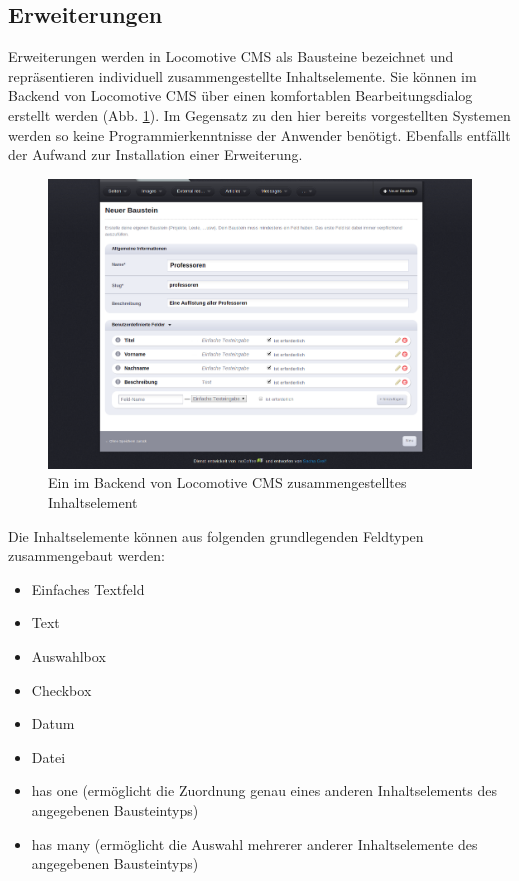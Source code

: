 \subsection{Erweiterungen}
\label{sec:ErweiterungenLocomotive}
Erweiterungen werden in Locomotive CMS als Bausteine bezeichnet und repräsentieren individuell zusammengestellte Inhaltselemente. Sie können im Backend von Locomotive CMS über einen komfortablen Bearbeitungsdialog erstellt werden (Abb. \ref{locomotivecontent}). Im Gegensatz zu den hier bereits vorgestellten Systemen werden so keine Programmierkenntnisse der Anwender benötigt. Ebenfalls entfällt der Aufwand zur Installation einer Erweiterung.
\begin{figure}[!h]
\begin{center}
\includegraphics[scale=0.3]{images/analyse/locomotive/customcontent.png}
\caption{Ein im Backend von Locomotive CMS zusammengestelltes Inhaltselement}
\label{locomotivecontent}
\end{center}
\end{figure}
\newpage
Die Inhaltselemente können aus folgenden grundlegenden Feldtypen zusammengebaut werden:
\begin{itemize}
\item
Einfaches Textfeld
\item
Text
\item
Auswahlbox
\item
Checkbox
\item
Datum
\item
Datei
\item
has one (ermöglicht die Zuordnung genau eines anderen Inhaltselements des angegebenen Bausteintyps)
\item
has many (ermöglicht die Auswahl mehrerer anderer Inhaltselemente des angegebenen Bausteintyps)
\end{itemize}

